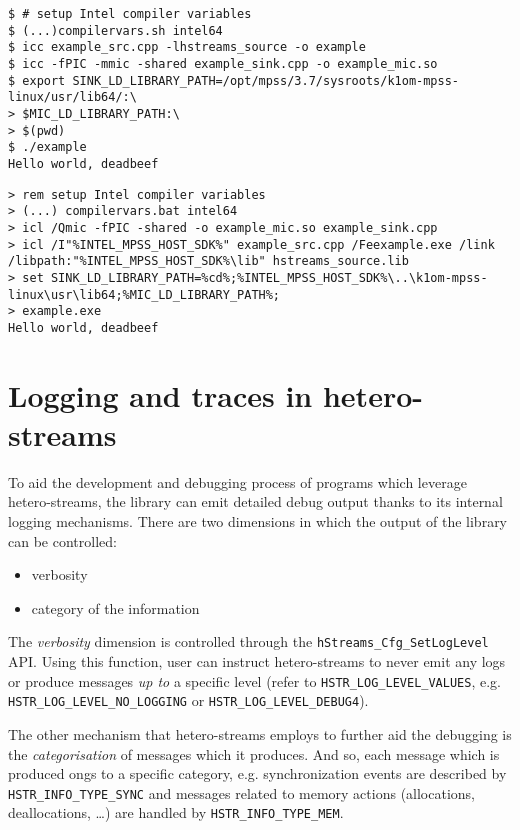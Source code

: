 \documentclass[a4,oneside]{book}
\begin{document}
\begin{lstlisting}[style=BashCmdListingStyle,caption={Compiling and running the example on Linux},frame=tlrb,label={lst:running-example-linux}]
$ # setup Intel compiler variables
$ (...)compilervars.sh intel64
$ icc example_src.cpp -lhstreams_source -o example
$ icc -fPIC -mmic -shared example_sink.cpp -o example_mic.so
$ export SINK_LD_LIBRARY_PATH=/opt/mpss/3.7/sysroots/k1om-mpss-linux/usr/lib64/:\
> $MIC_LD_LIBRARY_PATH:\
> $(pwd)
$ ./example
Hello world, deadbeef
\end{lstlisting}

\begin{lstlisting}[style=BatchListingStyle,caption={Compiling and running the example on Windows},frame=tlrb,label={lst:running-example-windows}]
> rem setup Intel compiler variables
> (...) compilervars.bat intel64
> icl /Qmic -fPIC -shared -o example_mic.so example_sink.cpp
> icl /I"%INTEL_MPSS_HOST_SDK%" example_src.cpp /Feexample.exe /link /libpath:"%INTEL_MPSS_HOST_SDK%\lib" hstreams_source.lib
> set SINK_LD_LIBRARY_PATH=%cd%;%INTEL_MPSS_HOST_SDK%\..\k1om-mpss-linux\usr\lib64;%MIC_LD_LIBRARY_PATH%;
> example.exe
Hello world, deadbeef
\end{lstlisting}

\section{Logging and traces in hetero-streams}
To aid the development and debugging process of programs which leverage hetero-streams, the library can emit detailed debug output thanks to its internal logging mechanisms.
There are two dimensions in which the output of the library can be controlled:
\begin{itemize}
    \item verbosity
    \item category of the information
\end{itemize}

The \emph{verbosity} dimension is controlled through the \texttt{hStreams\_Cfg\_SetLogLevel} API.
Using this function, user can instruct hetero-streams to never emit any logs or produce messages \emph{up to} a specific level (refer to \texttt{HSTR\_LOG\_LEVEL\_VALUES}, e.g. \texttt{HSTR\_LOG\_LEVEL\_NO\_LOGGING} or \texttt{HSTR\_LOG\_LEVEL\_DEBUG4}).

The other mechanism that hetero-streams employs to further aid the debugging is the \emph{categorisation} of messages which it produces.
And so, each message which is produced ongs to a specific category, e.g. synchronization events are described by \texttt{HSTR\_INFO\_TYPE\_SYNC} and messages related to memory actions (allocations, deallocations, \ldots) are handled by \texttt{HSTR\_INFO\_TYPE\_MEM}.
\end{document}
